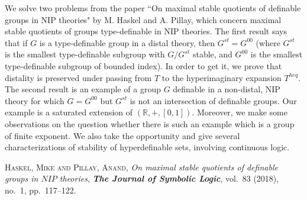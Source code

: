 \documentclass[bsl,meeting]{asl}
\newcommand{\NP}{}
\begin{document}
\thispagestyle{empty}

\NP  
{}

	We solve two problems from the paper ``On maximal stable quotients of definable groups in NIP theories" by M. Haskel and A. Pillay, which concern maximal stable quotients of groups type-definable in NIP theories. The first result says that if $G$ is a type-definable group in a distal theory, then $G^{st}=G^{00}$ (where $G^{st}$ is the smallest type-definable subgroup with $G/G^{st}$ stable, and $G^{00}$ is the smallest type-definable subgroup of bounded index). In order to get it, we prove that distality is preserved under passing from $T$ to the hyperimaginary expansion $T^{heq}$. The second result is an example of a group $G$ definable in a non-distal, NIP theory for which $G=G^{00}$ but $G^{st}$ is not an intersection of definable groups. Our example is a saturated extension of $(\mathbb{R},+,[0,1])$. Moreover, we make some observations on the question whether there is such an example which is a group of finite exponent. We also take the opportunity and give several characterizations of stability of hyperdefinable sets, involving continuous logic.




\begin{thebibliography}{10}


{\scshape Haskel, Mike and Pillay, Anand},
{\itshape On maximal stable quotients of definable groups in {$NIP$} theories},
{\bfseries\itshape The Journal of Symbolic Logic},
vol.~83 (2018), no.~1, pp.~117--122.

\end{thebibliography}


\vspace*{-0.5\baselineskip}
\end{document}
